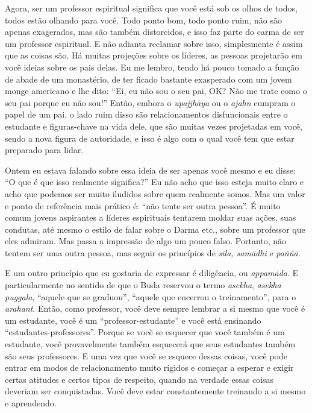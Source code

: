 Agora, ser um professor espiritual significa que você está sob os
olhos de todos, todos estão olhando para você. Todo ponto bom, todo
ponto ruim, não são apenas exagerados, mas são também distorcidos, e
isso faz parte do carma de ser um professor espiritual. E não adianta
reclamar sobre isso, simplesmente é assim que as coisas são. Há muitas
projeções sobre os líderes, as pessoas projetarão em você ideias sobre
os pais delas. Eu me lembro, tendo há pouco tomado a função de abade de
um monastério, de ter ficado bastante exasperado com um jovem monge
americano e lhe dito: “Ei, eu não sou o seu pai, OK? Não me trate como
o seu pai porque eu não sou!” Então, embora o \textit{upajjhāya} ou o
\textit{ajahn} cumpram o papel de um pai, o lado ruim disso são
relacionamentos disfuncionais entre o estudante e figuras-chave na vida
dele, que são muitas vezes projetadas em você, sendo a nova figura de
autoridade, e isso é algo com o qual você tem que estar preparado para
lidar. 

Ontem eu estava falando sobre essa ideia de ser apenas você mesmo e
eu disse: “O que é que isso realmente significa?” Eu não acho que isso
esteja muito claro e acho que podemos ser muito iludidos sobre quem
realmente somos. Mas um valor e ponto de referência mais prático é:
“não tente ser outra pessoa”. É muito comum jovens aspirantes a líderes
espirituais tentarem moldar suas ações, suas condutas, até mesmo o
estilo de falar sobre o Darma etc., sobre um professor que eles
admiram. Mas passa a impressão de algo um pouco falso. Portanto, não
tentem ser uma outra pessoa, mas seguir os princípios de
\textit{sīla, samādhi} e \textit{paññā}. 

E um outro princípio que eu gostaria de expressar é diligência, ou
\textit{appamāda}. E particularmente no sentido de que o Buda
reservou o termo \textit{asekha}, \textit{asekha puggala}, “aquele que
se graduou”, “aquele que encerrou o treinamento”, para o
\textit{arahant}. Então, como professor, você deve sempre lembrar a si
mesmo que você é um estudante, você é um “professor-estudante” e você
está ensinando “estudantes-professores”. Porque se você se esquecer que
você também é um estudante, você provavelmente também esquecerá que
seus estudantes também são seus professores. E uma vez que você se
esquece dessas coisas, você pode entrar em modos de relacionamento
muito rígidos e começar a esperar e exigir certas atitudes e certos
tipos de respeito, quando na verdade essas coisas deveriam ser
conquistadas. Você deve estar constantemente treinando a si mesmo e
aprendendo. 

